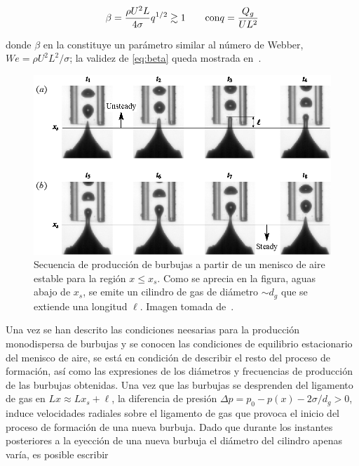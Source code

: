 \begin{equation}
\beta = \dfrac{\rho U^{2} L}{4\sigma}q^{1/2} \gtrsim 1 \qquad \mathrm{con} q = \dfrac{Q_{g}}{UL^{2}}
\LABEQ{beta}
\end{equation}

donde $\beta$ en la  constituye un parámetro similar al número de Webber, $We = \rho U^{2}L^{2}/\sigma$; la validez de \eqref{eq:beta} queda mostrada en~\cite{Evangelio2015b}.

\begin{figure}[hbtp!]
\includegraphics[scale=1]{introduccion/figuras/produccionEstable.eps}
\caption{Secuencia de producción de burbujas a partir de un menisco de aire estable para la región $x \leq x_{s}$. Como se aprecia en la figura, aguas abajo de $x_{s}$, se emite un cilindro de gas de diámetro $\sim d_{g}$ que se extiende una longitud $\ell$. Imagen tomada de~\cite{Evangelio2015b}.}
\end{figure}


Una vez se han descrito las condiciones neesarias para la producción monodispersa de burbujas y se conocen las condiciones de equilibrio estacionario del menisco de aire, se está en condición de describir el resto del proceso de formación, así como las expresiones de los diámetros y frecuencias de producción de las burbujas obtenidas. Una vez que las burbujas se desprenden del ligamento de gas en $Lx \approx Lx_{s} + \ell$, la diferencia de presión $\Delta p = p_{0} - p\left(x\right) -2\sigma/d_{g} > 0$, induce velocidades radiales sobre el ligamento de gas que provoca el inicio del proceso de formación de una nueva burbuja. Dado que durante los instantes posteriores a la eyección de una nueva burbuja el diámetro del cilindro apenas varía, es posible escribir

